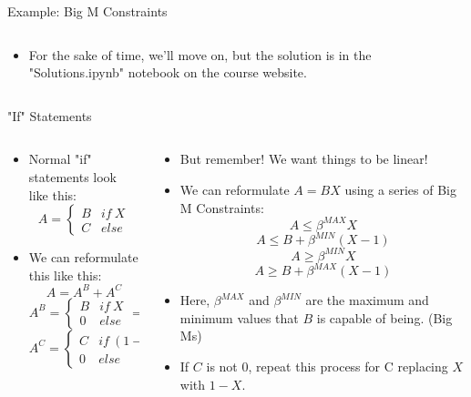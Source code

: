 \documentclass[10pt, aspectratio=169]{beamer}
\begin{document}
\begin{frame}{Example: Big M Constraints}
\begin{columns}
\begin{column}{0.5\textwidth}
\begin{itemize}
                (Spend 5 minutes trying to figure it out)
                \item For the sake of time, we'll move on, but the solution is in the "Solutions.ipynb" notebook on the course website.
            \end{itemize}
        \end{column}
    \end{columns}
\end{frame}

\begin{frame}{"If" Statements}
    \begin{columns}[t]
        \begin{column}[t]{0.5\textwidth}
            \begin{itemize}
                \item Normal "if" statements look like this:
                $$A = \begin{cases}B & if\ X\\C & else \end{cases}$$
                \item We can reformulate this like this:
                $$A = A^B + A^C$$
                $$A^B = \begin{cases}B & if\ X\\0 & else \end{cases} = BX$$
                $$A^C = \begin{cases}C & if\ (1-X)\\0 & else \end{cases} = C(1-X)$$
            \end{itemize}
        \end{column}
        \begin{column}[t]{0.5\textwidth}
            \begin{itemize}
                \item But remember! We want things to be linear!
                \item We can reformulate $A = BX$ using a series of Big M Constraints:
                $$A \leq \beta^{MAX} X$$
                $$A \leq B + \beta^{MIN}(X-1)$$
                $$A \geq \beta^{MIN}X$$
                $$A \geq B + \beta^{MAX}(X-1)$$
                \item Here, $\beta^{MAX}$ and $\beta^{MIN}$ are the maximum and minimum values that $B$ is capable of being. (Big Ms)
                \item If $C$ is not 0, repeat this process for C replacing $X$ with $1-X$.
            \end{itemize}
        \end{column}
    \end{columns}
\end{frame}
\end{document}
